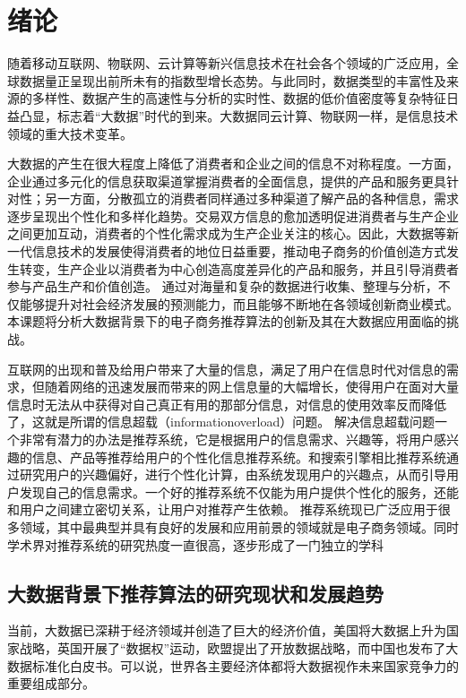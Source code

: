 
\chapter{绪论}
随着移动互联网、物联网、云计算等新兴信息技术在社会各个领域的广泛应用，全球数据量正呈现出前所未有的指数型增长态势。与此同时，数据类型的丰富性及来源的多样性、数据产生的高速性与分析的实时性、数据的低价值密度等复杂特征日益凸显，标志着“大数据”时代的到来。大数据同云计算、物联网一样，是信息技术领域的重大技术变革。

大数据的产生在很大程度上降低了消费者和企业之间的信息不对称程度。一方面，企业通过多元化的信息获取渠道掌握消费者的全面信息，提供的产品和服务更具针对性；另一方面，分散孤立的消费者同样通过多种渠道了解产品的各种信息，需求逐步呈现出个性化和多样化趋势。交易双方信息的愈加透明促进消费者与生产企业之间更加互动，消费者的个性化需求成为生产企业关注的核心。因此，大数据等新一代信息技术的发展使得消费者的地位日益重要，推动电子商务的价值创造方式发生转变，生产企业以消费者为中心创造高度差异化的产品和服务，并且引导消费者参与产品生产和价值创造。
通过对海量和复杂的数据进行收集、整理与分析，不仅能够提升对社会经济发展的预测能力，而且能够不断地在各领域创新商业模式。本课题将分析大数据背景下的电子商务推荐算法的创新及其在大数据应用面临的挑战。

互联网的出现和普及给用户带来了大量的信息，满足了用户在信息时代对信息的需求，但随着网络的迅速发展而带来的网上信息量的大幅增长，使得用户在面对大量信息时无法从中获得对自己真正有用的那部分信息，对信息的使用效率反而降低了，这就是所谓的信息超载（informationoverload）问题。
解决信息超载问题一个非常有潜力的办法是推荐系统，它是根据用户的信息需求、兴趣等，将用户感兴趣的信息、产品等推荐给用户的个性化信息推荐系统。和搜索引擎相比推荐系统通过研究用户的兴趣偏好，进行个性化计算，由系统发现用户的兴趣点，从而引导用户发现自己的信息需求。一个好的推荐系统不仅能为用户提供个性化的服务，还能和用户之间建立密切关系，让用户对推荐产生依赖。
推荐系统现已广泛应用于很多领域，其中最典型并具有良好的发展和应用前景的领域就是电子商务领域。同时学术界对推荐系统的研究热度一直很高，逐步形成了一门独立的学科


\section{大数据背景下推荐算法的研究现状和发展趋势}
当前，大数据已深耕于经济领域并创造了巨大的经济价值，美国将大数据上升为国家战略，英国开展了“数据权”运动，欧盟提出了开放数据战略，而中国也发布了大数据标准化白皮书。可以说，世界各主要经济体都将大数据视作未来国家竞争力的重要组成部分。

